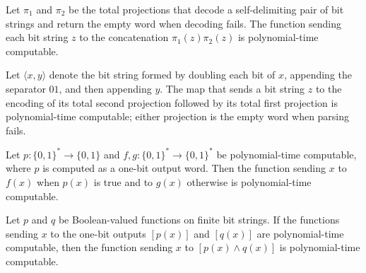 \begin{theorem}
\label{Complexity.polyTimeComputable_pairConcat}
\leanok
{}
Let $\pi_1$ and $\pi_2$ be the total projections that decode a self-delimiting pair of
bit strings and return the empty word when decoding fails. The function sending each bit
string $z$ to the concatenation $\pi_1(z)\pi_2(z)$ is polynomial-time computable.
\end{theorem}

\begin{theorem}
\label{Complexity.polyTimeComputable_pairSwap}
\leanok
{}
Let $\langle x,y\rangle$ denote the bit string formed by doubling each bit of $x$,
appending the separator $01$, and then appending $y$. The map that sends a bit string
$z$ to the encoding of its total second projection followed by its total first
projection is polynomial-time computable; either projection is the empty word when
parsing fails.
\end{theorem}

\begin{theorem}
\label{Complexity.polyTimeComputable_ite}
\leanok
{}
Let $p:
\{0,1\}^*\to\{0,1\}$ and $f,g:
\{0,1\}^*\to\{0,1\}^*$ be polynomial-time computable, where $p$ is computed as a one-bit
output word. Then the function sending $x$ to $f(x)$ when $p(x)$ is true and to $g(x)$
otherwise is polynomial-time computable.
\end{theorem}

\begin{theorem}
\label{Complexity.polyTimeComputable_and}
\leanok
{}
Let $p$ and $q$ be Boolean-valued functions on finite bit strings. If the functions
sending $x$ to the one-bit outputs $[p(x)]$ and $[q(x)]$ are polynomial-time computable,
then the function sending $x$ to $[p(x)\land q(x)]$ is polynomial-time computable.
\end{theorem}

